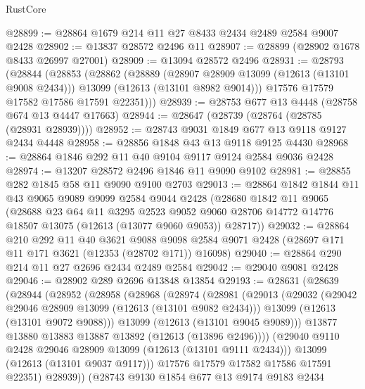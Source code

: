 \begin{lexlean}{RustCore}
\begin{coremodule}
@28899 := @28864 @1679 @214 @11 @27 @8433 @2434 @2489 @2584 @9007 @2428
@28902 := @13837 @28572 @2496 @11
@28907 := @28899 (@28902 @1678 @8433 @26997 @27001)
@28909 := @13094 @28572 @2496
@28931 := @28793
    (@28844
      (@28853
        (@28862
          (@28889
            (@28907 @28909 @13099 (@12613 (@13101 @9008 @2434)))
            @13099
            (@12613 (@13101 @8982 @9014)))
          @17576
          @17579
          @17582
          @17586
          @17591
          @22351)))
@28939 := @28753 @677 @13 @4448 (@28758 @674 @13 @4447 @17663)
@28944 := @28647 (@28739 (@28764 (@28785 (@28931 @28939))))
@28952 := @28743 @9031 @1849 @677 @13 @9118 @9127 @2434 @4448
@28958 := @28856 @1848 @43 @13 @9118 @9125 @4430
@28968 := @28864 @1846 @292 @11 @40 @9104 @9117 @9124 @2584 @9036 @2428
@28974 := @13207 @28572 @2496 @1846 @11 @9090 @9102
@28981 := @28855 @282 @1845 @58 @11 @9090 @9100 @2703
@29013 := @28864
    @1842
    @1844
    @11
    @43
    @9065
    @9089
    @9099
    @2584
    @9044
    @2428
    (@28680
      @1842
      @11
      @9065
      (@28688
        @23
        @64
        @11
        @3295
        @2523
        @9052
        @9060
        @28706
        @14772
        @14776
        @18507
        @13075
        (@12613 (@13077 @9060 @9053))
        @28717))
@29032 := @28864
    @210
    @292
    @11
    @40
    @3621
    @9088
    @9098
    @2584
    @9071
    @2428
    (@28697 @171 @11 @171 @3621 (@12353 (@28702 @171)) @16098)
@29040 := @28864 @290 @214 @11 @27 @2696 @2434 @2489 @2584
@29042 := @29040 @9081 @2428
@29046 := @28902 @289 @2696 @13848 @13854
@29193 := @28631
    (@28639
      (@28944
        (@28952
          (@28958
            (@28968
              (@28974
                (@28981
                  (@29013
                    (@29032
                      (@29042 @29046 @28909 @13099 (@12613 (@13101 @9082 @2434)))
                      @13099
                      (@12613 (@13101 @9072 @9088)))
                    @13099
                    (@12613 (@13101 @9045 @9089)))
                  @13877
                  @13880
                  @13883
                  @13887
                  @13892
                  (@12613 (@13896 @2496))))
              (@29040 @9110 @2428 @29046 @28909 @13099 (@12613 (@13101 @9111 @2434)))
              @13099
              (@12613 (@13101 @9037 @9117)))
            @17576
            @17579
            @17582
            @17586
            @17591
            @22351)
          @28939))
      (@28743
        @9130
        @1854
        @677
        @13
        @9174
        @9183
        @2434

\end{coremodule}
\end{lexlean}
